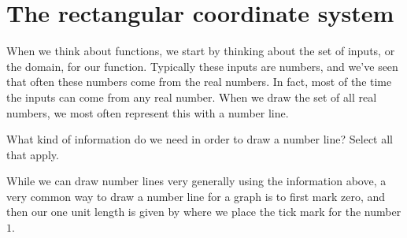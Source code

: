 \documentclass{ximera}
\begin{document}
\section{The rectangular coordinate system}
When we think about functions, we start by thinking about the set of inputs, or the domain, for our function. Typically these inputs are numbers, and we've seen that often these numbers come from the real numbers. In fact, most of the time the inputs can come from any real number. When we draw the set of all real numbers, we most often represent this with a number line. 
\begin{question}
What kind of information do we need in order to draw a number line? Select all that apply.
\begin{selectAll}
\end{selectAll}
\end{question}
While we can draw number lines very generally using the information above, a very common way to draw  a number line for a graph is to first mark zero, and then our one unit length is given by where we place the tick mark for the number $1$.
\begin{image}
\end{image}
\end{document}
